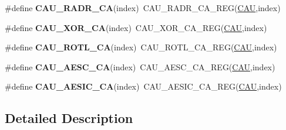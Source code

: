 \begin{DoxyCompactItemize}
\item 
\#define {\bfseries C\+A\+U\+\_\+\+R\+A\+D\+R\+\_\+\+CA}(index)~C\+A\+U\+\_\+\+R\+A\+D\+R\+\_\+\+C\+A\+\_\+\+R\+EG(\hyperlink{group__CAU__Peripheral__Access__Layer_ga0e3e4bb9b7bb5ef30b07e8925c56b950}{C\+AU},index)\hypertarget{group__CAU__Register__Accessor__Macros_ga6670c61be3f73ebd4873b77e3a1b17d8}{}\label{group__CAU__Register__Accessor__Macros_ga6670c61be3f73ebd4873b77e3a1b17d8}

\item 
\#define {\bfseries C\+A\+U\+\_\+\+X\+O\+R\+\_\+\+CA}(index)~C\+A\+U\+\_\+\+X\+O\+R\+\_\+\+C\+A\+\_\+\+R\+EG(\hyperlink{group__CAU__Peripheral__Access__Layer_ga0e3e4bb9b7bb5ef30b07e8925c56b950}{C\+AU},index)\hypertarget{group__CAU__Register__Accessor__Macros_gac86698627f42e0a60c70c0836ffae788}{}\label{group__CAU__Register__Accessor__Macros_gac86698627f42e0a60c70c0836ffae788}

\item 
\#define {\bfseries C\+A\+U\+\_\+\+R\+O\+T\+L\+\_\+\+CA}(index)~C\+A\+U\+\_\+\+R\+O\+T\+L\+\_\+\+C\+A\+\_\+\+R\+EG(\hyperlink{group__CAU__Peripheral__Access__Layer_ga0e3e4bb9b7bb5ef30b07e8925c56b950}{C\+AU},index)\hypertarget{group__CAU__Register__Accessor__Macros_ga7937a6362fddd808f677101e46c8a95a}{}\label{group__CAU__Register__Accessor__Macros_ga7937a6362fddd808f677101e46c8a95a}

\item 
\#define {\bfseries C\+A\+U\+\_\+\+A\+E\+S\+C\+\_\+\+CA}(index)~C\+A\+U\+\_\+\+A\+E\+S\+C\+\_\+\+C\+A\+\_\+\+R\+EG(\hyperlink{group__CAU__Peripheral__Access__Layer_ga0e3e4bb9b7bb5ef30b07e8925c56b950}{C\+AU},index)\hypertarget{group__CAU__Register__Accessor__Macros_ga3ffef6d404b59f0f9d6ae36f5fdc5da0}{}\label{group__CAU__Register__Accessor__Macros_ga3ffef6d404b59f0f9d6ae36f5fdc5da0}

\item 
\#define {\bfseries C\+A\+U\+\_\+\+A\+E\+S\+I\+C\+\_\+\+CA}(index)~C\+A\+U\+\_\+\+A\+E\+S\+I\+C\+\_\+\+C\+A\+\_\+\+R\+EG(\hyperlink{group__CAU__Peripheral__Access__Layer_ga0e3e4bb9b7bb5ef30b07e8925c56b950}{C\+AU},index)\hypertarget{group__CAU__Register__Accessor__Macros_gabc2e4ec881a8e397076e7db53aefe02f}{}\label{group__CAU__Register__Accessor__Macros_gabc2e4ec881a8e397076e7db53aefe02f}

\end{DoxyCompactItemize}


\subsection{Detailed Description}
